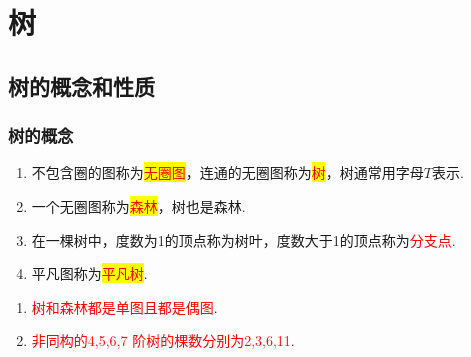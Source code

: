 \section{树}
\subsection{树的概念和性质}
\subsubsection{树的概念}
\begin{definition}
\begin{enumerate}
	\item 不包含圈的图称为\colorbox{yellow}{\textcolor{red}{无圈图}}，连通的无圈图称为\colorbox{yellow}{\textcolor{red}{树}}，树通常用字母$T$表示.
	\item 一个无圈图称为\colorbox{yellow}{\textcolor{red}{森林}}，树也是森林.
	\item 在一棵树中，度数为1的顶点称为树叶，度数大于1的顶点称为\textcolor{red}{分支点}.
	\item 平凡图称为\colorbox{yellow}{\textcolor{red}{平凡树}}.
\end{enumerate}
\begin{note}
	\begin{enumerate}
		\item \textcolor{red}{树和森林都是单图且都是偶图}.
		\item \textcolor{red}{非同构的4,5,6,7 阶树的棵数分别为2,3,6,11}.
	\end{enumerate}
	\begin{figure}[H]
	\small
	\centering 

\end{figure}
\end{note}
\end{definition}
